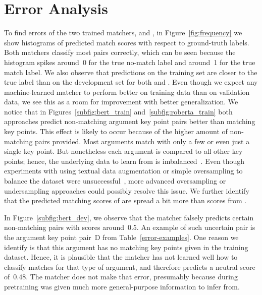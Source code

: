 \section{Error Analysis}\label{error-analysis}




To find errors of the two trained matchers, \BertBase and \RobertaBase, in Figure~\ref{fig:frequency} we show 
histograms of predicted match scores with respect to ground-truth labels.
Both matchers classify most pairs correctly, which can be seen because the histogram spikes around~0 for the 
true no-match label and around~1 for the true match label.
We also observe that predictions on the training set are closer to the true label than on the development set 
for both \RobertaBase and \BertBase.
Even though we expect any machine-learned matcher to perform better on training data than on validation data, 
we see this as a room for improvement with better generalization.
We notice that in Figures~\ref{subfig:bert_train} and~\ref{subfig:roberta_train} both approaches predict non-matching 
argument key point pairs better than matching key points.
This effect is likely to occur because of the higher amount of non-matching pairs provided.
Most arguments match with only a few or even just a single key point.
But nonetheless each argument is compared to all other key points; hence, the underlying data to learn from is 
imbalanced~\cite{BarandelaVSF2004}.
Even though experiments with using textual data augmentation or simple oversampling to balance the dataset were 
unsuccessful~\cite{Dietterich1995}, more advanced oversampling or undersampling approaches could possibly resolve this issue.
We further identify that the predicted matching scores of \BertBase are spread a 
bit more than scores from \RobertaBase.

In Figure~\ref{subfig:bert_dev}, we observe that the \BertBase matcher falsely predicts certain non-matching pairs with scores around~0.5.
An example of such uncertain pair is the argument key point pair~D from Table~\ref{error-examples}.
One reason we identify is that this argument has no matching key points given in the training dataset.
Hence, it is plausible that the \BertBase matcher has not learned well how to classify matches for that type of 
argument, and therefore predicts a neutral score of~\(0.48\).
The \RobertaBase matcher does not make that error, presumably because during pretraining \Roberta was given much 
more general-purpose information to infer from.

